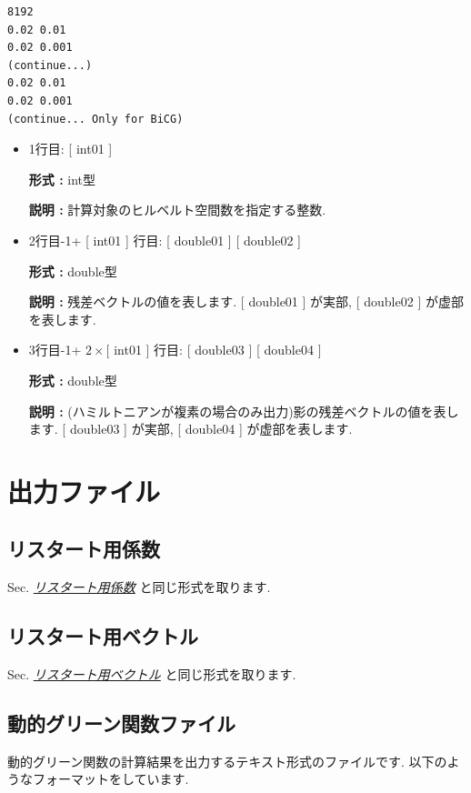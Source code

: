 \documentclass[letterpaper,10pt,dvipdfmx,openany]{sphinxmanual}
\begin{document}
\begin{Verbatim}[commandchars=\\\{\}]
8192
0.02 0.01
0.02 0.001
(continue...)
0.02 0.01
0.02 0.001
(continue... Only for BiCG)
\end{Verbatim}
\begin{itemize}
\item {} 
1行目: {[} int01 {]}

\textbf{形式 :} int型

\textbf{説明 :} 計算対象のヒルベルト空間数を指定する整数.

\item {} 
2行目-1+ {[} int01 {]} 行目:
{[} double01 {]} {[} double02 {]}

\textbf{形式 :} double型

\textbf{説明 :} 残差ベクトルの値を表します.
{[} double01 {]} が実部, {[} double02 {]} が虚部を表します.

\item {} 
3行目-1+ \(2\times[\) int01 {]} 行目:
{[} double03 {]} {[} double04 {]}

\textbf{形式 :} double型

\textbf{説明 :}
(ハミルトニアンが複素の場合のみ出力)影の残差ベクトルの値を表します.
{[} double03 {]} が実部, {[} double04 {]} が虚部を表します.

\end{itemize}


\section{出力ファイル}
\label{shiftk_format_ja:id6}

\subsection{リスタート用係数}
\label{shiftk_format_ja:id7}
Sec. {\hyperref[shiftk_format_ja:recoeff]{\emph{リスタート用係数}}} と同じ形式を取ります.


\subsection{リスタート用ベクトル}
\label{shiftk_format_ja:id8}
Sec. {\hyperref[shiftk_format_ja:revec]{\emph{リスタート用ベクトル}}} と同じ形式を取ります.


\subsection{動的グリーン関数ファイル}
\label{shiftk_format_ja:dynamicalg}\label{shiftk_format_ja:id9}
動的グリーン関数の計算結果を出力するテキスト形式のファイルです.
以下のようなフォーマットをしています.
\end{document}
